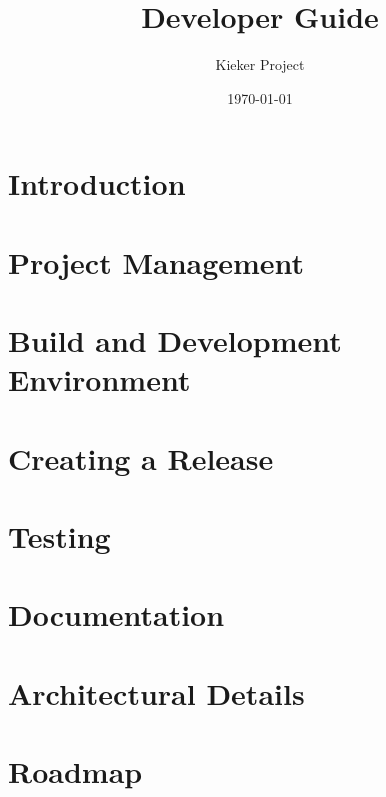 \documentclass[a4paper, oneside, 11pt, pointlessnumbers, headsepline]{scrbook}
\title{%
\Huge\Kieker{} Developer Guide%
}
\author{\sffamily Kieker Project}
\date{\sffamily\today}
\begin{document}
  \maketitle
  \tableofcontents

\chapter{Introduction}


\chapter{Project Management}


\chapter{Build and Development Environment}


\chapter{Creating a Release}


\chapter{Testing}


\chapter{Documentation}


\chapter{Architectural Details}


\chapter{Roadmap}

\end{document}
